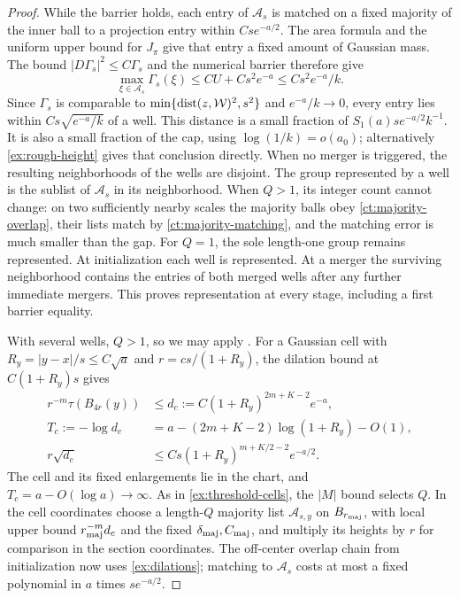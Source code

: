 \begin{proof}
While the barrier holds, each entry of \(\mathcal A_s\) is matched on
a fixed majority of the inner ball to a projection entry within
\(Cs e^{-a/2}\). The area formula and the uniform upper bound for
\(J_\pi\) give that entry a fixed amount of Gaussian mass. The bound
\(|D\Gamma_s|^2\le C\Gamma_s\) and the numerical barrier therefore give
\[
 \max_{\xi\in\mathcal A_s}\Gamma_s(\xi)
 \le C U+Cs^2e^{-a}
 \le Cs^2e^{-a}/k.
\]
Since \(\Gamma_s\) is comparable to
\(\min\{\operatorname{dist}(z,\mathcal W)^2,s^2\}\) and \(e^{-a}/k\to0\), every
entry lies within \(Cs\sqrt{e^{-a}/k}\) of a well. This distance is a small
fraction of \(S_1(a)se^{-a/2}k^{-1}\). It is also a small fraction
of the cap, using \(\log(1/k)=o(a_0)\); alternatively
\eqref{ex:rough-height} gives that conclusion directly. When no
merger is triggered, the resulting neighborhoods of the wells are
disjoint. The group represented by a well is the sublist of
\(\mathcal A_s\) in its neighborhood. When \(Q>1\), its integer count
cannot change: on two sufficiently nearby scales the majority balls
obey \eqref{ct:majority-overlap}, their lists match by
\eqref{ct:majority-matching}, and the matching error is much smaller
than the gap. For \(Q=1\), the sole length-one group remains represented.
At initialization each well is represented. At a merger
the surviving neighborhood contains the entries of both merged wells
after any further immediate mergers. This proves representation at
every stage, including a first barrier equality.

With several wells, \(Q>1\), so we may apply .
For a Gaussian cell with \(R_y=|y-x|/s\le C\sqrt a\) and
\(r=cs/(1+R_y)\), the dilation bound at \(C(1+R_y)s\) gives
\begin{equation}
 \begin{split}
 r^{-m}\tau(B_{4r}(y))
   &\le d_c:=C(1+R_y)^{2m+K-2}e^{-a},\\
 T_c:=-\log d_c
   &=a-(2m+K-2)\log(1+R_y)-O(1),\\
 r\sqrt{d_c}
   &\le Cs(1+R_y)^{m+K/2-2}e^{-a/2}.
 \end{split}
 \label{ex:transition-cells}
\end{equation}
The cell and its fixed enlargements lie in the chart, and
\(T_c=a-O(\log a)\to\infty\). As in \eqref{ex:threshold-cells},
the \(|M|\) bound selects \(Q\). In the cell coordinates choose a
length-\(Q\) majority list \(\mathcal A_{s,y}\) on
\(B_{r_{\rm maj}}\), with local upper bound \(r_{\rm maj}^{-m}d_c\)
and the fixed \(\delta_{\rm maj},C_{\rm maj}\), and multiply its
heights by \(r\) for comparison in the section coordinates. The
off-center overlap chain from initialization now uses
\eqref{ex:dilations}; matching to \(\mathcal A_s\) costs at most a
fixed polynomial in \(a\) times \(s e^{-a/2}\).


\end{proof}
